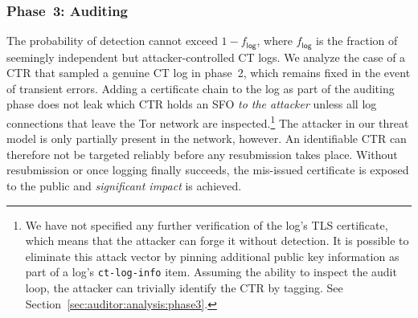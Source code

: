 \subsubsection{Phase~3: Auditing} \label{sec:analysis:pr:phase3}
The probability of detection cannot exceed $1-f_{\mathsf{log}}$, where
$f_{\mathsf{log}}$ is the fraction of seemingly independent but
attacker-controlled CT logs.  We analyze the case of a CTR that sampled a
genuine CT log in phase~2, which remains fixed in the event of transient errors.
Adding a certificate chain to the log as part of the auditing phase does not
leak which CTR holds an SFO \emph{to the attacker} unless all log connections
that leave the Tor network are inspected.\footnote{%
	We have not specified any further verification of the log's TLS certificate,
	which means that the attacker can forge it without detection.  It is
	possible to eliminate this attack vector by pinning additional public key
	information as part of a log's \texttt{ct-log-info} item.  Assuming the
	ability to inspect the audit loop, the attacker can trivially identify
	the CTR by tagging.  See Section~\ref{sec:auditor:analysis:phase3}.
} The attacker in our threat model is only partially present in the network,
however.  An identifiable CTR can therefore not be targeted reliably before any
resubmission takes place.  Without resubmission or once logging finally
succeeds, the mis-issued certificate is exposed to the public and
\emph{significant impact} is achieved.
